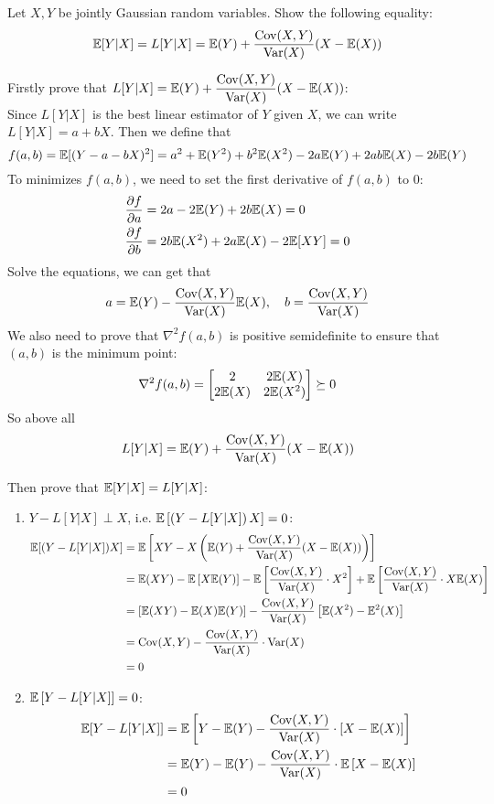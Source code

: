 \begin{homeworkProblem}

Let $X, Y$ be jointly Gaussian random variables. Show the following equality:
$$\mathbb{E}[Y | X]=L[Y | X]=\mathbb{E}(Y)+\dfrac{\mathrm{Cov}(X, Y)}{\mathrm{Var}(X)}(X-\mathbb{E}(X))$$

\solution
Firstly prove that $L[Y|X]=\mathbb{E}(Y)+\dfrac{\mathrm{Cov}(X, Y)}{\mathrm{Var}(X)}(X-\mathbb{E}(X))$: \\
Since $L[Y|X]$ is the best linear estimator of $Y$ given $X$, we can write $L[Y|X]=a+bX$. Then we define that
$$f(a,b) = \mathbb{E}[(Y - a - bX)^2] = a^2 + \mathbb{E}(Y^2) + b^2 \mathbb{E}(X^2) - 2a \mathbb{E}(Y) + 2ab \mathbb{E}(X) - 2b \mathbb{E}(Y)$$
To minimizes $f(a,b)$, we need to set the first derivative of $f(a,b)$ to $0$:
\begin{align*}
\dfrac{\partial f}{\partial a} &= 2a - 2\mathbb{E}(Y) + 2b \mathbb{E}(X) = 0 \\
\dfrac{\partial f}{\partial b} &= 2b \mathbb{E}(X^2) + 2a \mathbb{E}(X) - 2\mathbb{E}[XY] = 0
\end{align*}
Solve the equations, we can get that
$$a = \mathbb{E}(Y) - \dfrac{\mathrm{Cov}(X,Y)}{\mathrm{Var}(X)} \mathbb{E}(X),\quad b = \dfrac{\mathrm{Cov}(X,Y)}{\mathrm{Var}(X)}$$
We also need to prove that $\nabla^2 f(a,b)$ is positive semidefinite to ensure that $(a, b)$ is the minimum point:
$$\nabla^2 f(a,b) = \begin{bmatrix} 2 & 2 \mathbb{E}(X) \\ 2 \mathbb{E}(X) & 2 \mathbb{E}(X^2) \end{bmatrix}\succeq 0$$
So above all
$$L[Y|X] = \mathbb{E}(Y) + \dfrac{\mathrm{Cov}(X,Y)}{\mathrm{Var}(X)} (X - \mathbb{E}(X))$$


Then prove that $\mathbb{E}[Y|X]=L[Y|X]$:
\begin{enumerate}
\item $Y-L[Y|X] \perp X$, i.e. $\mathbb{E}\left[\left(Y-L[Y|X]\right)X\right]=0$:
\begin{align*}
\mathbb{E}[(Y - L[Y|X])X] &= \mathbb{E}\left[XY - X\left(\mathbb{E}(Y)+\dfrac{\mathrm{Cov}(X, Y)}{\mathrm{Var}(X)}(X-\mathbb{E}(X))\right)\right] \\
&= \mathbb{E}(XY) - \mathbb{E}\left[X\mathbb{E}(Y)\right] - \mathbb{E}\left[\dfrac{\mathrm{Cov}(X,Y)}{\mathrm{Var}(X)}\cdot X^2\right] + \mathbb{E}\left[\dfrac{\mathrm{Cov}(X,Y)}{\mathrm{Var}(X)}\cdot X \mathbb{E}(X)\right] \\
&= \left[\mathbb{E}(XY) - \mathbb{E}(X)\mathbb{E}(Y)\right] - \dfrac{\mathrm{Cov}(X,Y)}{\mathrm{Var}(X)}\left[\mathbb{E}(X^2) - \mathbb{E}^2(X)\right] \\
&= \mathrm{Cov}(X,Y) - \dfrac{\mathrm{Cov}(X,Y)}{\mathrm{Var}(X)} \cdot \mathrm{Var}(X) \\
&= 0
\end{align*}
\item $\mathbb{E}\left[Y-L[Y|X]\right] = 0$:
\begin{align*}
\mathbb{E}[Y - L[Y|X]] &= \mathbb{E}\left[Y - \mathbb{E}(Y) - \dfrac{\mathrm{Cov}(X,Y)}{\mathrm{Var}(X)}\cdot\left[X - \mathbb{E}(X)\right]\right] \\
&= \mathbb{E}(Y) - \mathbb{E}(Y) - \dfrac{\mathrm{Cov}(X,Y)}{\mathrm{Var}(X)}\cdot\mathbb{E}\left[X - \mathbb{E}(X)\right] \\
&= 0
\end{align*}


\end{enumerate}
\end{homeworkProblem}
